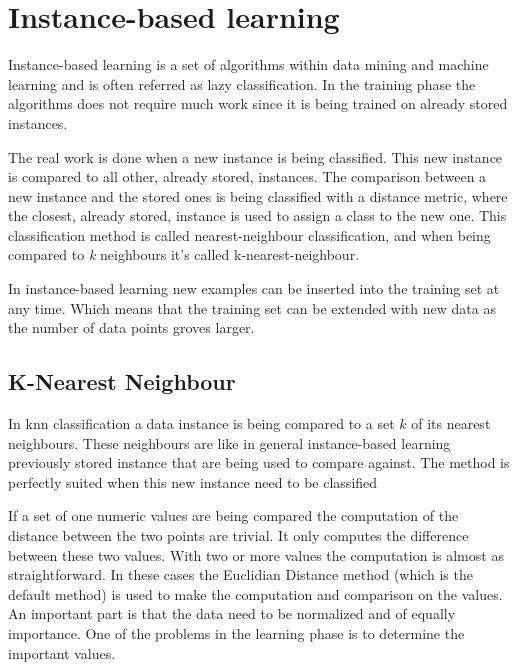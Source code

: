 \section{Instance-based learning}\label{sec:theoryInstanceLearning}
Instance-based learning is a set of algorithms within data mining and machine learning and is often referred as lazy classification.
In the training phase the algorithms does not require much work since it is being trained on already stored instances.
\cite[p. 78]{DataMiningPractical2011} 

\bigskip

The real work is done when a new instance is being classified.
This new instance is compared to all other, already stored, instances. 
The comparison between a new instance and the stored ones is being classified with a distance metric, where the closest, already stored, instance is used to assign a class to the new one.
This classification method is called nearest-neighbour classification, and when being compared to \textit{k} neighbours it's called k-nearest-neighbour.
\cite[p. 78]{DataMiningPractical2011} 

\bigskip

In instance-based learning new examples can be inserted into the training set at any time.
Which means that the training set can be extended with new data as the number of data points groves larger.
\cite[p. 135]{DataMiningPractical2011} 


\subsection{K-Nearest Neighbour}\label{sec:theoryUnClassKnn}
In \acrfull{knn} classification a data instance is being compared to a set $k$ of its nearest neighbours.
These neighbours are like in general instance-based learning previously stored instance that are being used to compare against.
The method is perfectly suited when this new instance need to be classified \cite[p. 77-79]{DataMiningPractical2011}

\bigskip

If a set of one numeric values are being compared the computation of the distance between the two points are trivial. 
It only computes the difference between these two values.
With two or more values the computation is almost as straightforward.
In these cases the Euclidian Distance method (which is the default method) is used to make the computation and comparison on the values.
An important part is that the data need to be normalized and of equally importance.
One of the problems in the learning phase is to determine the important values.
\cite[p. 77-79]{DataMiningPractical2011}

